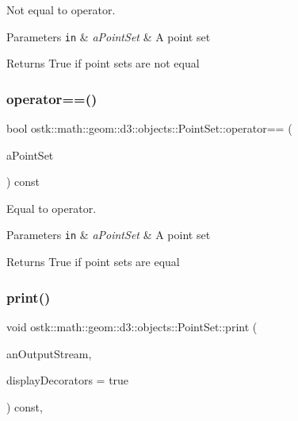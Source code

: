 Not equal to operator. 


\begin{DoxyParams}[1]{Parameters}
\mbox{\tt in}  & {\em a\+Point\+Set} & A point set \\
\hline
\end{DoxyParams}
\begin{DoxyReturn}{Returns}
True if point sets are not equal 
\end{DoxyReturn}
\mbox{\label{classostk_1_1math_1_1geom_1_1d3_1_1objects_1_1_point_set_a2561f42d2df2e1adf5e6417a2e7e9698}} 
\subsubsection{\texorpdfstring{operator==()}{operator==()}}
{\footnotesize\ttfamily bool ostk\+::math\+::geom\+::d3\+::objects\+::\+Point\+Set\+::operator== (\begin{DoxyParamCaption}\item[{const \hyperlink{classostk_1_1math_1_1geom_1_1d3_1_1objects_1_1_point_set}{Point\+Set} \&}]{a\+Point\+Set }\end{DoxyParamCaption}) const}



Equal to operator. 


\begin{DoxyParams}[1]{Parameters}
\mbox{\tt in}  & {\em a\+Point\+Set} & A point set \\
\hline
\end{DoxyParams}
\begin{DoxyReturn}{Returns}
True if point sets are equal 
\end{DoxyReturn}
\mbox{\label{classostk_1_1math_1_1geom_1_1d3_1_1objects_1_1_point_set_adeeac2042e2e518b51c3b8dc4365c130}} 
\subsubsection{\texorpdfstring{print()}{print()}}
{\footnotesize\ttfamily void ostk\+::math\+::geom\+::d3\+::objects\+::\+Point\+Set\+::print (\begin{DoxyParamCaption}\item[{std\+::ostream \&}]{an\+Output\+Stream,  }\item[{bool}]{display\+Decorators = {\ttfamily true} }\end{DoxyParamCaption}) const\hspace{0.3cm}{\ttfamily [override]}, {\ttfamily [virtual]}}



